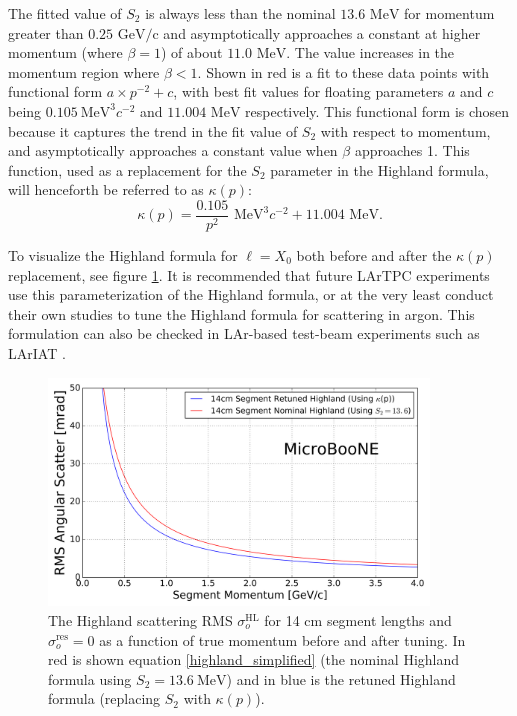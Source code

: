 \documentclass[a4paper,11pt]{article}
\begin{document}
The fitted value of $S_2$ is always less than the nominal $13.6\text{ MeV}$ for momentum greater than $0.25\text{ GeV/c}$ and asymptotically approaches a constant at higher momentum (where $\beta = 1$) of about $11.0\text{ MeV}$. The value increases in the momentum region where $\beta < 1$. Shown in red is a fit to these data points with functional form $a\times p^{-2} + c$, with best fit values for floating parameters $a$ and $c$ being $0.105~\text{MeV}^3c^{-2}$ and $11.004\text{ MeV}$ respectively. This functional form is chosen because it captures the trend in the fit value of $S_2$ with respect to momentum, and asymptotically approaches a constant value when $\beta$ approaches 1. This function, used as a replacement for the $S_2$ parameter in the Highland formula, will henceforth be referred to as $\kappa(p)$:
\begin{equation}\label{kappa_equation}
\kappa(p) = \frac{0.105}{p^2}\text{ MeV}^3c^{-2} + 11.004\text{ MeV}.
\end{equation}

To visualize the Highland formula for ${\ell} = X_0$ both before and after the $\kappa(p)$ replacement, see figure \ref{retune_highland_fig2}. It is recommended that future LArTPC experiments use this parameterization of the Highland formula, or at the very least conduct their own studies to tune the Highland formula for scattering in argon. This formulation can also be checked in LAr-based test-beam experiments such as LArIAT \cite{LARIAT_citation}.\\

\begin{figure}[ht!]
\begin{center}
\includegraphics[width=0.9\textwidth]{Figures/highland_formula_visualized_twoforms.png}
\end{center}
\caption{The Highland scattering RMS $\sigma_o^{\text{HL}}$ for 14 cm segment lengths and $\sigma_o^{\text{res}}=0$ as a function of true momentum before and after tuning. In red is shown equation \ref{highland_simplified} (the nominal Highland formula using $S_2 = 13.6~\text{MeV}$) and in blue is the retuned Highland formula (replacing $S_2$ with $\kappa(p)$).}
\label{retune_highland_fig2}
\end{figure}
\end{document}
